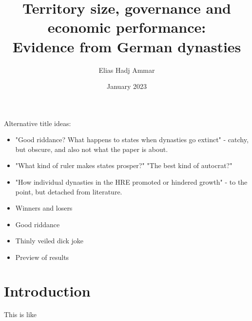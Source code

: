 \documentclass{article}
\title{Territory size, governance and economic performance: \\Evidence from German dynasties}
\author{Elias Hadj Ammar}
\date{January 2023}
\begin{document}
\maketitle
\thispagestyle{empty}

Alternative title ideas: 
\begin{itemize}
    \item "Good riddance? What happens to states when dynasties go extinct" - catchy, but obscure, and also not what the paper is about.
    \item "What kind of ruler makes states prosper?" "The best kind of autocrat?"
    \item "How individual dynasties in the HRE promoted or hindered growth" - to the point, but detached from literature.
    \item Winners and losers
    \item Good riddance
    \item Thinly veiled dick joke
    \item Preview of results
\end{itemize}

\newpage

\setcounter{page}{1}
 
\section{Introduction}

This is like \cite{alesinaS1997} 

\newpage


\end{document}
